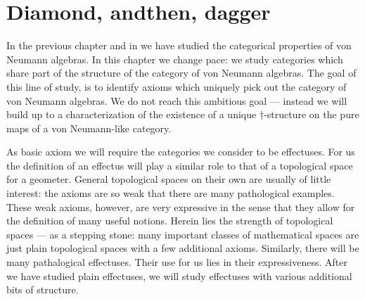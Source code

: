 \documentclass[b]{subfiles}
\begin{document}
\chapter{Diamond, andthen, dagger}

\begin{parsec}%
\begin{point}%
In the previous chapter and in 
    we have studied the categorical properties of von Neumann algebras.
In this chapter we change pace:
    we study categories which share part of the structure
    of the category of von Neumann algebras.
The goal of this line of study, is to identify
    axioms which uniquely pick out the category of von Neumann algebras.
We do not reach this ambitious goal ---
    instead we will build up to a characterization of
    the existence of a unique $\dagger$-structure
    on the pure maps of a von Neumann-like category.
\end{point}
\begin{point}%
As basic axiom we will require the categories we consider to be
    effectuses.
For us the definition of an effectus will play a similar role
    to that of a topological space for a geometer.
General topological spaces on their own are usually of little interest:
    the axioms are so weak that there are many pathological examples.
    These weak axioms, however, are very expressive in the sense
    that they allow for the definition of many useful notions.
    Herein lies the strength of topological spaces ---
    as a stepping stone:
    many important classes of mathematical spaces
    are just plain topological spaces with a few additional axioms.
Similarly, there will be many pathalogical effectuses.
Their use for us lies in their expressiveness.
After we have studied plain effectuses,
    we will study effectuses with various additional bits of structure.
\end{point}
\end{parsec}
\end{document}
